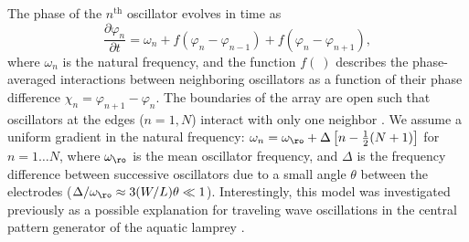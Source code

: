  The phase of the $n^{\text{th}}$ oscillator evolves in time as
\begin{equation}
    \frac{\partial \varphi_n}{\partial t} = \omega_n + f(\varphi_n - \varphi_{n-1}) + f(\varphi_n - \varphi_{n+1}), \label{eq:phase}
\end{equation}
where $\omega_n$ is the natural frequency, and the function $f(~)$ describes the phase-averaged interactions between neighboring oscillators as a function of their phase difference $\chi_n=\varphi_{n+1}-\varphi_n$. The boundaries of the array are open such that oscillators at the edges ($n=1,N$) interact with only one neighbor \autocite{Ottino-Loffler2016}. We assume a uniform gradient in the natural frequency:  $\omega_n = \omega_{\ro} +  \Delta \left[n-\tfrac{1}{2}(N+1)\right]$ for $n=1\dots N$, where $\omega_{\ro}$ is the mean oscillator frequency, and $\Delta$ is the frequency difference between successive oscillators due to a small angle $\theta$ between the electrodes ($\Delta/\omega_{\ro} \approx 3(W/L)\theta  \ll 1$).  Interestingly, this model was investigated previously as a possible explanation for traveling wave oscillations in the central pattern generator of the aquatic lamprey \autocite{Cohen1982}. 

